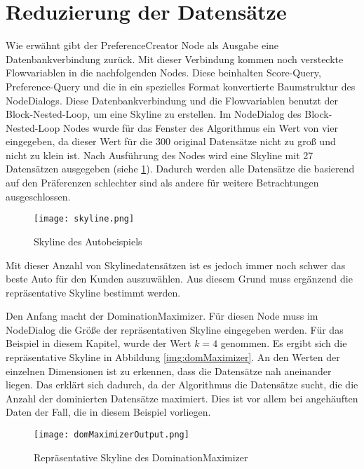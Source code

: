 \section{Reduzierung der Datensätze}
\label{ch:Evaluierung:sec:repSkyline}
Wie erwähnt gibt der PreferenceCreator Node als Ausgabe eine Datenbankverbindung zurück. Mit dieser Verbindung kommen noch versteckte Flowvariablen in die nachfolgenden Nodes. Diese beinhalten Score-Query, Preference-Query und die in ein spezielles Format konvertierte Baumstruktur des NodeDialogs. Diese Datenbankverbindung und die Flowvariablen benutzt der Block-Nested-Loop, um eine Skyline zu erstellen. Im NodeDialog des Block-Nested-Loop Nodes wurde für das Fenster des Algorithmus ein Wert von vier eingegeben, da dieser Wert für die 300 original Datensätze  nicht zu groß und nicht zu klein ist. Nach Ausführung des Nodes wird eine Skyline mit 27 Datensätzen ausgegeben (siehe \ref{img:skyline}). Dadurch werden alle Datensätze die basierend auf den Präferenzen schlechter sind als andere für weitere Betrachtungen ausgeschlossen.

\begin{figure}[H]
	\centering
	\texttt{[image: skyline.png]}
	\caption{Skyline des Autobeispiels}
	\label{img:skyline}
\end{figure} 

Mit dieser Anzahl von Skylinedatensätzen ist es jedoch immer noch schwer das beste Auto für den Kunden auszuwählen. Aus diesem Grund muss ergänzend die repräsentative Skyline bestimmt werden.

Den Anfang macht der DominationMaximizer. Für diesen Node muss im NodeDialog die Größe der repräsentativen Skyline eingegeben werden. Für das Beispiel in diesem Kapitel, wurde der Wert $k=4$ genommen. Es ergibt sich die repräsentative Skyline in Abbildung \ref{img:domMaximizer}. An den Werten der einzelnen Dimensionen ist zu erkennen, dass die Datensätze nah aneinander liegen. Das erklärt sich dadurch, da der Algorithmus die Datensätze sucht, die die Anzahl der dominierten Datensätze maximiert. Dies ist vor allem bei angehäuften Daten der Fall, die in diesem Beispiel vorliegen.

\begin{figure}[H]
	\centering
	\texttt{[image: domMaximizerOutput.png]}
	\caption{Repräsentative Skyline des DominationMaximizer}
	\label{img:domMaximizerOutput}
\end{figure} 

